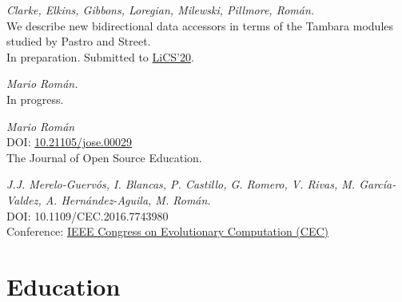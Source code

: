 \documentclass[nocolors]{friggeri-cv-a4}
\begin{document}
 \begin{entrylist}
   {
     \textit{Clarke, Elkins, Gibbons, Loregian, Milewski, Pillmore, Román.} \\
     We describe new bidirectional data accessors in terms of the Tambara modules studied by Pastro and Street. \\
     In preparation. Submitted to \href{https://lics.siglog.org/lics20/}{LiCS'20}. \\
     }

   {
     \textit{Mario Román.} \\
     In progress. \\
     }

   {
     \textit{Mario Román} \\
     DOI: \href{https://jose.theoj.org/papers/10.21105/jose.00029}{10.21105/jose.00029} \\
     The Journal of Open Source Education.
   }
   
   {
     \textit{J.J. Merelo-Guervós, I. Blancas, P. Castillo, G. Romero, V. Rivas, M. García-Valdez, A. Hernández-Aguila, M. Román.} \\
     DOI: 10.1109/CEC.2016.7743980 \\
     Conference: \href{http://ieeexplore.ieee.org/document/7743980/2016}{IEEE Congress on Evolutionary Computation (CEC)}
   }

\end{entrylist}



\section{Education}
\end{document}
